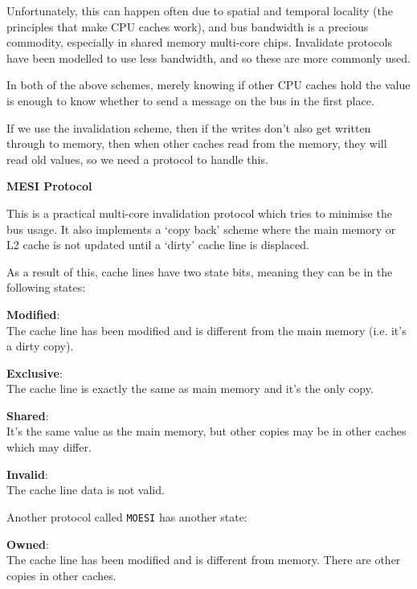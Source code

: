 Unfortunately, this can happen often due to spatial and temporal locality (the
principles that make CPU caches work), and bus bandwidth is a precious
commodity, especially in shared memory multi-core chips. Invalidate protocols
have been modelled to use less bandwidth, and so these are more commonly used.

In both of the above schemes, merely knowing if other CPU caches hold the value
is enough to know whether to send a message on the bus in the first place.

If we use the invalidation scheme, then if the writes don't also get written
through to memory, then when other caches read from the memory, they will read
old values, so we need a protocol to handle this.

\textbf{MESI Protocol}

This is a practical multi-core invalidation protocol which tries to minimise the
bus usage. It also implements a `copy back' scheme where the main memory or L2
cache is not updated until a `dirty' cache line is displaced. 

As a result of this, cache lines have two state bits, meaning they can be in the
following states:

\begin{description}
  \item \textbf{Modified}:\\
    The cache line has been modified and is different from the main memory (i.e.
    it's a dirty copy).
  \item \textbf{Exclusive}:\\
    The cache line is exactly the same as main memory and it's the only copy.
  \item \textbf{Shared}:\\
    It's the same value as the main memory, but other copies may be in other
    caches which may differ.
  \item \textbf{Invalid}:\\
    The cache line data is not valid.
\end{description} 

Another protocol called \texttt{MOESI} has another state:

\begin{description}
  \item \textbf{Owned}:\\
    The cache line has been modified and is different from memory. There are
    other copies in other caches.
\end{description}

